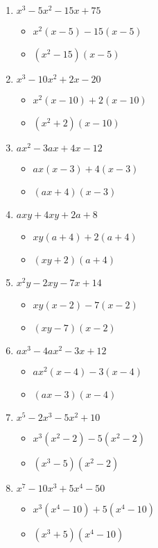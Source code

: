 \begin{enumerate}
\item $x^{3} - 5x^{2} - 15x + 75$
  \begin{itemize}
  \item $x^{2}(x-5)-15(x-5)$
  \item $(x^{2}-15)(x-5)$
  \end{itemize}
\item $x^{3} - 10x^{2} + 2x - 20$
  \begin{itemize}
  \item $x^{2}(x-10)+2(x-10)$
  \item $(x^{2}+2)(x-10)$
  \end{itemize}
\item $ax^{2} - 3ax + 4x - 12$
  \begin{itemize}
  \item $ax(x-3)+4(x-3)$
  \item $(ax+4)(x-3)$
  \end{itemize}
\item $axy + 4xy + 2a + 8$
  \begin{itemize}
  \item $xy(a+4)+2(a+4)$
  \item $(xy+2)(a+4)$
  \end{itemize}
\item $x^{2}y - 2xy - 7x + 14$
  \begin{itemize}
  \item $xy(x-2)-7(x-2)$
  \item $(xy-7)(x-2)$
  \end{itemize}
\item $ax^{3} - 4ax^{2} - 3x + 12$
  \begin{itemize}
  \item $ax^{2}(x-4)-3(x-4)$
  \item $(ax-3)(x-4)$
  \end{itemize}
\item $x^{5} - 2x^{3} - 5x^{2} + 10$
  \begin{itemize}
  \item $x^{3}(x^{2}-2)-5(x^{2}-2)$
  \item $(x^{3}-5)(x^{2}-2)$
  \end{itemize}
\item $x^{7} - 10x^{3} + 5x^{4} - 50$
  \begin{itemize}
  \item $x^{3}(x^{4}-10)+5(x^{4}-10)$
  \item $(x^{3}+5)(x^{4}-10)$

\end{itemize}
\end{enumerate}
